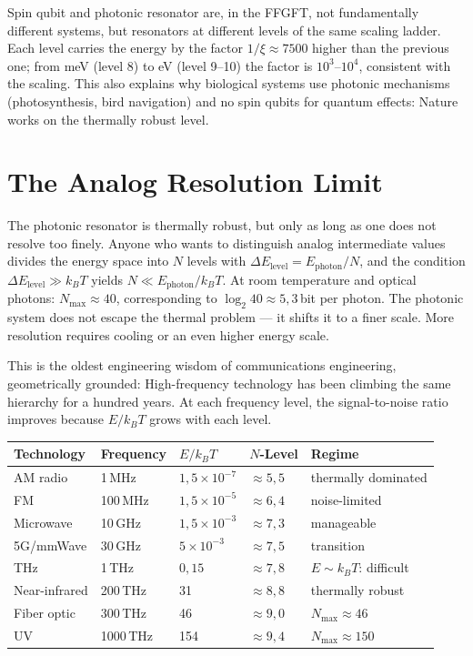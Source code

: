 Spin qubit and photonic resonator are, in the FFGFT, not
fundamentally different systems, but resonators at different
levels of the same scaling ladder. Each level carries the energy by the
factor $1/\xi\approx7500$ higher than the previous one; from meV (level 8) to
eV (level 9--10) the factor is $10^3$--$10^4$, consistent with the
scaling. This also explains why biological systems
use photonic mechanisms (photosynthesis, bird navigation) and no
spin qubits for quantum effects: Nature works on the
thermally robust level.

\section{The Analog Resolution Limit}

The photonic resonator is thermally robust, but only as long as one
does not resolve too finely. Anyone who wants to distinguish analog intermediate values
divides the energy space into $N$ levels with $\Delta E_{\mathrm{level}} =
E_{\mathrm{photon}}/N$, and the condition $\Delta E_{\mathrm{level}}\gg
k_BT$ yields $N\ll E_{\mathrm{photon}}/k_BT$. At room temperature and
optical photons: $N_{\max}\approx40$, corresponding to
$\log_2 40\approx5{,}3$\,bit per photon. The photonic system does not escape
the thermal problem --- it shifts it to a finer
scale. More resolution requires cooling or an even higher
energy scale.

This is the oldest engineering wisdom of communications engineering,
geometrically grounded: High-frequency technology has been climbing the same
hierarchy for a hundred years. At each frequency level, the signal-to-noise
ratio improves because $E/k_BT$ grows with each level.

\begin{center}
\footnotesize\renewcommand{\arraystretch}{1.25}
\begin{tabular}{p{2.2cm}p{1.3cm}p{1.6cm}p{1.2cm}p{2.9cm}}
\toprule
\textbf{Technology} & \textbf{Frequency} & \textbf{$E/k_BT$} & \textbf{$N$-Level} & \textbf{Regime} \\
\midrule
AM radio & 1\,MHz & $1{,}5\times10^{-7}$ & $\approx5{,}5$ & thermally dominated \\
FM & 100\,MHz & $1{,}5\times10^{-5}$ & $\approx6{,}4$ & noise-limited \\
Microwave & 10\,GHz & $1{,}5\times10^{-3}$ & $\approx7{,}3$ & manageable \\
5G/mmWave & 30\,GHz & $5\times10^{-3}$ & $\approx7{,}5$ & transition \\
THz & 1\,THz & $0{,}15$ & $\approx7{,}8$ & $E\sim k_BT$: difficult \\
Near-infrared & 200\,THz & 31 & $\approx8{,}8$ & thermally robust \\
Fiber optic & 300\,THz & 46 & $\approx9{,}0$ & $N_{\max}\approx46$ \\
UV & 1000\,THz & 154 & $\approx9{,}4$ & $N_{\max}\approx150$ \\
\bottomrule
\end{tabular}
\end{center}


